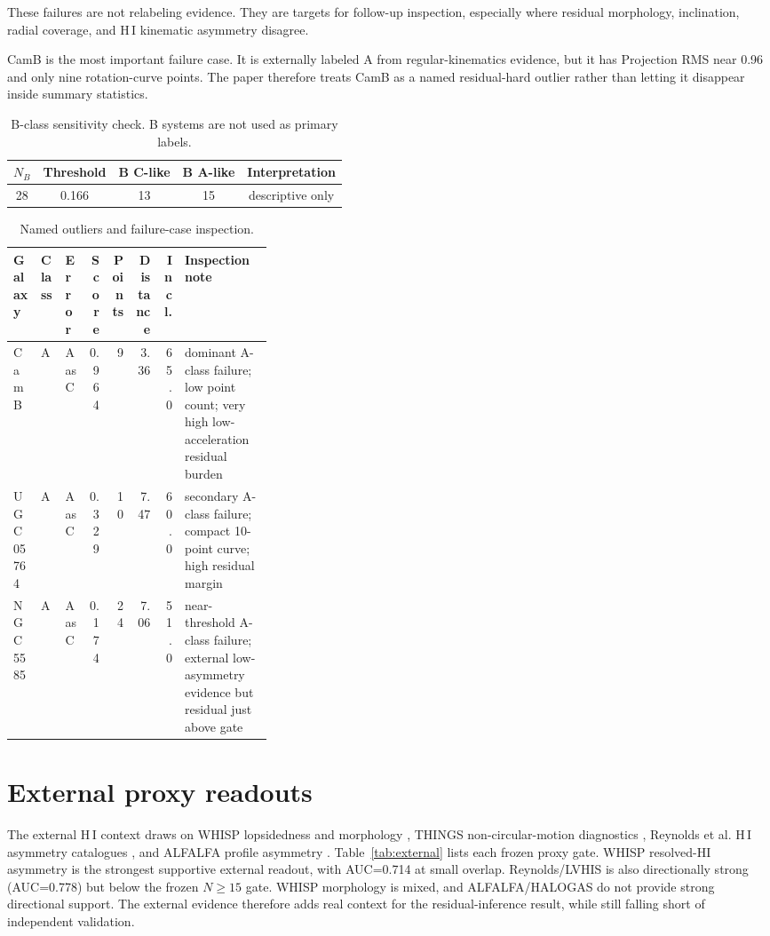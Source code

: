 \documentclass[11pt]{article}
\begin{document}
These failures are not relabeling evidence. They are targets for follow-up inspection, especially where residual morphology, inclination, radial coverage, and H\,I kinematic asymmetry disagree.

CamB is the most important failure case. It is externally labeled A from regular-kinematics evidence, but it has Projection RMS near 0.96 and only nine rotation-curve points. The paper therefore treats CamB as a named residual-hard outlier rather than letting it disappear inside summary statistics.

\begin{table}[H]
\centering
\caption{B-class sensitivity check. B systems are not used as primary labels.}
\begin{tabular}{ccccc}
\toprule
$N_B$ & Threshold & B C-like & B A-like & Interpretation\\
\midrule
28 & 0.166 & 13 & 15 & descriptive only\\
\bottomrule
\end{tabular}
\end{table}

\begin{table}[H]
\centering
\caption{Named outliers and failure-case inspection.}
\scriptsize
\setlength{\tabcolsep}{3pt}
\begin{tabular}{lllrrrrp{0.34\linewidth}}
\toprule
Galaxy & Class & Error & Score & Points & Distance & Incl. & Inspection note\\
\midrule
CamB & A & A as C & 0.964 & 9 & 3.36 & 65.0 & dominant A-class failure; low point count; very high low-acceleration residual burden\\
UGC05764 & A & A as C & 0.329 & 10 & 7.47 & 60.0 & secondary A-class failure; compact 10-point curve; high residual margin\\
NGC5585 & A & A as C & 0.174 & 24 & 7.06 & 51.0 & near-threshold A-class failure; external low-asymmetry evidence but residual just above gate\\
\bottomrule
\end{tabular}
\end{table}

\section{External proxy readouts}

The external H\,I context draws on WHISP lopsidedness and morphology \cite{vanEymeren2011WHISP,vanEymeren2011WHISPII,Holwerda2011WHISP}, THINGS non-circular-motion diagnostics \cite{Trachternach2008THINGS}, Reynolds et al. H\,I asymmetry catalogues \cite{Reynolds2020HIAsymmetries}, and ALFALFA profile asymmetry \cite{Yu2022ALFALFA}. Table~\ref{tab:external} lists each frozen proxy gate. WHISP resolved-HI asymmetry is the strongest supportive external readout, with AUC=0.714 at small overlap. Reynolds/LVHIS is also directionally strong (AUC=0.778) but below the frozen $N\geq15$ gate. WHISP morphology is mixed, and ALFALFA/HALOGAS do not provide strong directional support. The external evidence therefore adds real context for the residual-inference result, while still falling short of independent validation.
\end{document}
